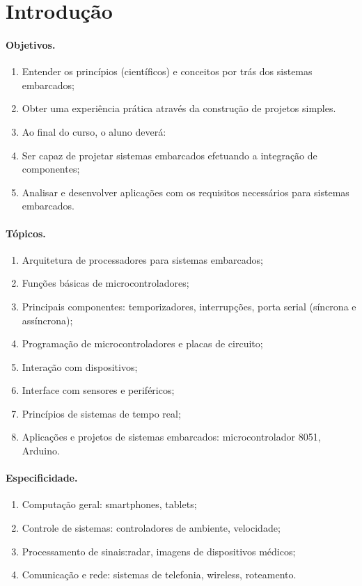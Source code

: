 \section*{Introdução}

\paragraph{Objetivos.}

\begin{enumerate}
\item Entender os princípios (científicos) e conceitos por trás dos sistemas embarcados;
\item Obter uma experiência prática através da construção de projetos simples.
\item Ao final do curso, o aluno deverá:
\item Ser capaz de projetar sistemas embarcados efetuando a integração de componentes;
\item Analisar e desenvolver aplicações com os requisitos necessários para sistemas embarcados.
\end{enumerate}

\paragraph{Tópicos.}

\begin{enumerate}
\item Arquitetura de processadores para sistemas embarcados;
\item Funções básicas de microcontroladores;
\item Principais componentes: temporizadores, interrupções, porta serial (síncrona e assíncrona);
\item Programação de microcontroladores e placas de circuito;
\item Interação com dispositivos;
\item Interface com sensores e periféricos;
\item Princípios de sistemas de tempo real;
\item Aplicações e projetos de sistemas embarcados: microcontrolador 8051, Arduino. 
\end{enumerate}

\paragraph{Especificidade.}

\begin{enumerate}

	\item Computação geral: smartphones, tablets;
	\item Controle de sistemas: controladores de ambiente, velocidade;
	\item Processamento de sinais:radar, imagens de dispositivos médicos;
	\item Comunicação e rede: sistemas de telefonia, wireless, roteamento.
\end{enumerate}

